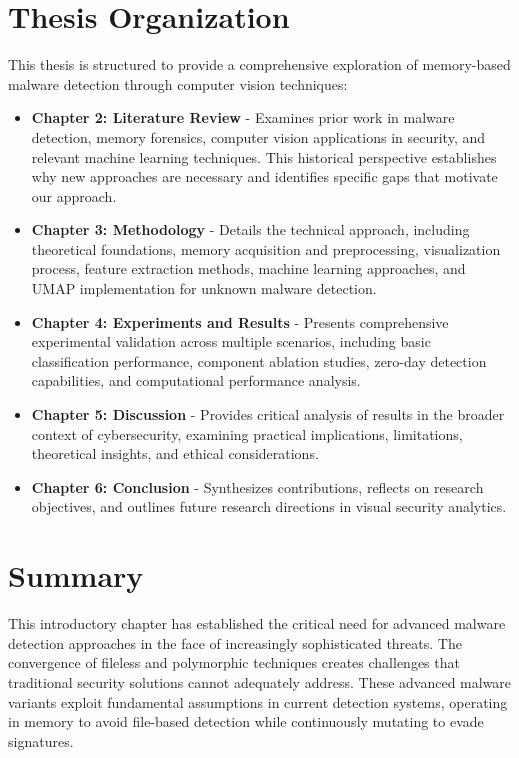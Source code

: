 \section{Thesis Organization}
\label{sec:organization}

This thesis is structured to provide a comprehensive exploration of memory-based malware detection through computer vision techniques:

\begin{itemize}
    \item \textbf{Chapter 2: Literature Review} - Examines prior work in malware detection, memory forensics, computer vision applications in security, and relevant machine learning techniques. This historical perspective establishes why new approaches are necessary and identifies specific gaps that motivate our approach.
    
    \item \textbf{Chapter 3: Methodology} - Details the technical approach, including theoretical foundations, memory acquisition and preprocessing, visualization process, feature extraction methods, machine learning approaches, and UMAP implementation for unknown malware detection.
    
    \item \textbf{Chapter 4: Experiments and Results} - Presents comprehensive experimental validation across multiple scenarios, including basic classification performance, component ablation studies, zero-day detection capabilities, and computational performance analysis.
    
    \item \textbf{Chapter 5: Discussion} - Provides critical analysis of results in the broader context of cybersecurity, examining practical implications, limitations, theoretical insights, and ethical considerations.
    
    \item \textbf{Chapter 6: Conclusion} - Synthesizes contributions, reflects on research objectives, and outlines future research directions in visual security analytics.
\end{itemize}

\section{Summary}
\label{sec:intro_summary}

This introductory chapter has established the critical need for advanced malware detection approaches in the face of increasingly sophisticated threats. The convergence of fileless and polymorphic techniques creates challenges that traditional security solutions cannot adequately address. These advanced malware variants exploit fundamental assumptions in current detection systems, operating in memory to avoid file-based detection while continuously mutating to evade signatures.

